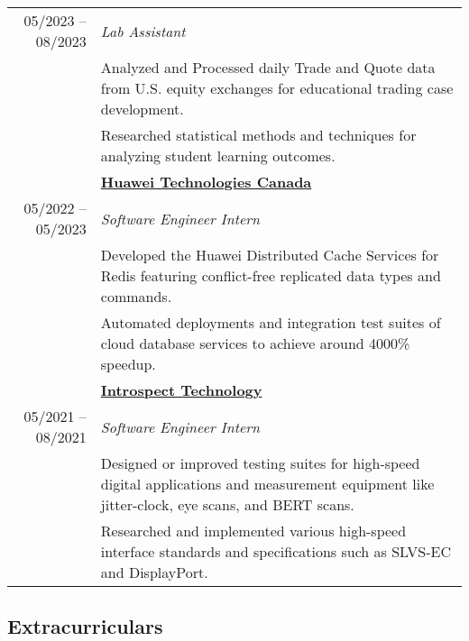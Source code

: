 \documentclass{article}
\begin{document}
\begin{tabularx}{\textwidth}{r X}
		05/2023 -- 08/2023 & \textit{Lab Assistant} \\*
		& {\small Analyzed and Processed daily Trade and Quote data from U.S. equity exchanges for educational trading case development.} \\*
		& {\small Researched statistical methods and techniques for analyzing student learning outcomes.} \\
		\addlinespace
		& \textbf{\href{https://www.huawei.com/ca/}{Huawei Technologies Canada}} \\*
		05/2022 -- 05/2023 & \textit{Software Engineer Intern} \\*
		& {\small Developed the Huawei Distributed Cache Services for Redis featuring conflict-free replicated data types and commands.} \\*
		& {\small Automated deployments and integration test suites of cloud database services to achieve around 4000\% speedup.} \\
		\addlinespace
		& \textbf{\href{https://introspect.ca/}{Introspect Technology}} \\*
		05/2021 -- 08/2021 & \textit{Software Engineer Intern} \\*
		& {\small Designed or improved testing suites for high-speed digital applications and measurement equipment like jitter-clock, eye scans, and BERT scans.} \\*
		& {\small Researched and implemented various high-speed interface standards and specifications such as SLVS-EC and DisplayPort.} \\*
	\end{tabularx}

	\subsection*{Extracurriculars}
\end{document}
